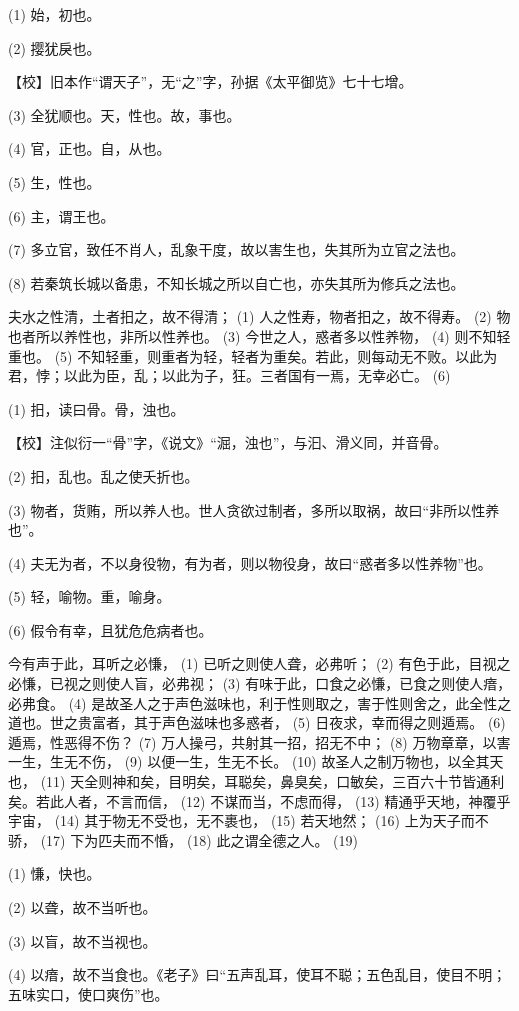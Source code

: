 \documentclass[12pt,UTF8]{ctexbook}
\begin{document}
(1) 始，初也。

(2) 撄犹戾也。

【校】旧本作“谓天子”，无“之”字，孙据《太平御览》七十七增。

(3) 全犹顺也。天，性也。故，事也。

(4) 官，正也。自，从也。

(5) 生，性也。

(6) 主，谓王也。

(7) 多立官，致任不肖人，乱象干度，故以害生也，失其所为立官之法也。

(8) 若秦筑长城以备患，不知长城之所以自亡也，亦失其所为修兵之法也。

夫水之性清，土者抇之，故不得清； (1) 人之性寿，物者抇之，故不得寿。 (2) 物也者所以养性也，非所以性养也。 (3) 今世之人，惑者多以性养物， (4) 则不知轻重也。 (5) 不知轻重，则重者为轻，轻者为重矣。若此，则每动无不败。以此为君，悖；以此为臣，乱；以此为子，狂。三者国有一焉，无幸必亡。 (6)

(1) 抇，读曰骨。骨，浊也。

【校】注似衍一“骨”字，《说文》“淈，浊也”，与汩、滑义同，并音骨。

(2) 抇，乱也。乱之使夭折也。

(3) 物者，货贿，所以养人也。世人贪欲过制者，多所以取祸，故曰“非所以性养也”。

(4) 夫无为者，不以身役物，有为者，则以物役身，故曰“惑者多以性养物”也。

(5) 轻，喻物。重，喻身。

(6) 假令有幸，且犹危危病者也。

今有声于此，耳听之必慊， (1) 已听之则使人聋，必弗听； (2) 有色于此，目视之必慊，已视之则使人盲，必弗视； (3) 有味于此，口食之必慊，已食之则使人瘖，必弗食。 (4) 是故圣人之于声色滋味也，利于性则取之，害于性则舍之，此全性之道也。世之贵富者，其于声色滋味也多惑者， (5) 日夜求，幸而得之则遁焉。 (6) 遁焉，性恶得不伤？ (7) 万人操弓，共射其一招，招无不中； (8) 万物章章，以害一生，生无不伤， (9) 以便一生，生无不长。 (10) 故圣人之制万物也，以全其天也， (11) 天全则神和矣，目明矣，耳聪矣，鼻臭矣，口敏矣，三百六十节皆通利矣。若此人者，不言而信， (12) 不谋而当，不虑而得， (13) 精通乎天地，神覆乎宇宙， (14) 其于物无不受也，无不裹也， (15) 若天地然； (16) 上为天子而不骄， (17) 下为匹夫而不惛， (18) 此之谓全德之人。 (19)

(1) 慊，快也。

(2) 以聋，故不当听也。

(3) 以盲，故不当视也。

(4) 以瘖，故不当食也。《老子》曰“五声乱耳，使耳不聪；五色乱目，使目不明；五味实口，使口爽伤”也。
\end{document}

